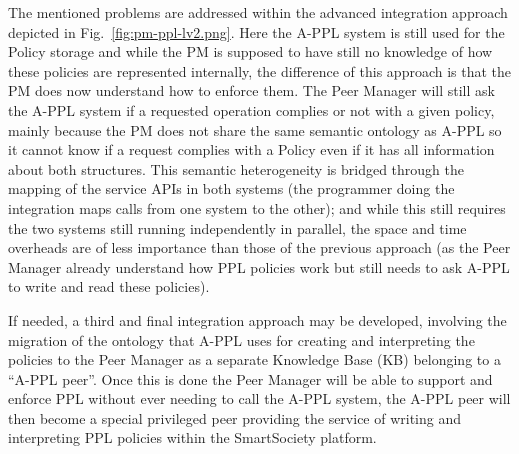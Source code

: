 The mentioned problems are addressed within the advanced integration approach depicted in Fig.~\ref{fig:pm-ppl-lv2.png}. Here the A-PPL system is still used for the Policy storage and while the PM is supposed to have still no knowledge of how these policies are represented internally, the difference of this approach is that the PM does now understand how to enforce them. The Peer Manager will still ask the A-PPL system if a requested operation complies or not with a given policy, mainly because the PM does not share the same semantic ontology as A-PPL so it cannot know if a request complies with a Policy even if it has all information about both structures. This semantic heterogeneity is bridged through the mapping of the service APIs in both systems (the programmer doing the integration maps calls from one system to the other); and while this still requires the two systems still running independently in parallel, the space and time overheads are of less importance than those of the previous approach (as the Peer Manager already understand how PPL policies work but still needs to ask A-PPL to write and read these policies).

If needed, a third and final integration approach may be developed, involving the migration of the ontology that A-PPL uses for creating and interpreting the policies to the Peer Manager as a separate Knowledge Base (KB) belonging to a ``A-PPL peer''. Once this is done the Peer Manager will be able to support and enforce PPL without ever needing to call the A-PPL system, the A-PPL peer will then become a special privileged peer providing the service of writing and interpreting PPL policies within the SmartSociety platform. 


